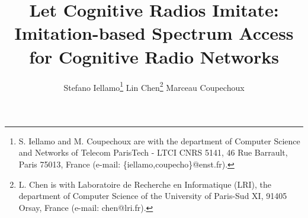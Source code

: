 \documentclass[12pt, onecolumn]{IEEEtran}
\theoremstyle{plain}
\theoremstyle{definition}
\begin{document}
\newlength{\figurewidth}\setlength{\figurewidth}{0.6\columnwidth}



\addtolength{\topmargin}{-0.5\baselineskip}
\addtolength{\textheight}{\baselineskip}

\title{Let Cognitive Radios Imitate: Imitation-based Spectrum Access for Cognitive Radio Networks}

\setcounter{one}{1}
\setcounter{two}{2}

\author{Stefano Iellamo\footnote{S. Iellamo and M. Coupechoux are with the department of Computer Science and Networks of Telecom ParisTech - LTCI CNRS 5141, 46 Rue Barrault, Paris 75013, France (e-mail: \{iellamo,coupecho\}@enst.fr).} \qquad\qquad Lin Chen\footnote{L. Chen is with Laboratoire de Recherche en Informatique (LRI), the department of Computer Science of the University of Paris-Sud XI, 91405 Orsay, France (e-mail: chen@lri.fr).} \qquad\qquad Marceau Coupechoux}


\addtolength{\floatsep}{-\baselineskip}
\addtolength{\dblfloatsep}{-\baselineskip}
\addtolength{\textfloatsep}{-\baselineskip}
\addtolength{\dbltextfloatsep}{-\baselineskip}
\addtolength{\abovedisplayskip}{-1ex}
\addtolength{\belowdisplayskip}{-1ex}
\addtolength{\abovedisplayshortskip}{-1ex}
\addtolength{\belowdisplayshortskip}{-1ex}

\maketitle

\vspace{-1cm}
\end{document}
